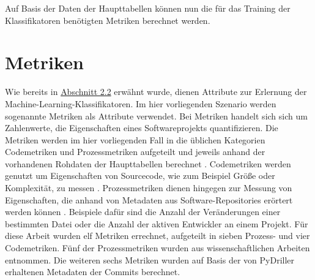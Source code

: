 Auf Basis der Daten der Haupttabellen können nun die für das Training der Klassifikatoren benötigten Metriken berechnet werden.

\section{Metriken}

Wie bereits in \hyperref[classification]{Abschnitt 2.2} erwähnt wurde, dienen Attribute zur Erlernung der Machine-Learning-Klassifikatoren. Im hier vorliegenden Szenario werden sogenannte Metriken als Attribute verwendet. Bei Metriken handelt sich sich um Zahlenwerte, die Eigenschaften eines Softwareprojekts quantifizieren. Die Metriken werden im hier vorliegenden Fall in die üblichen Kategorien Codemetriken und Prozessmetriken aufgeteilt und jeweils anhand der vorhandenen Rohdaten der Haupttabellen berechnet \cite{Rahman2013}. Codemetriken werden genutzt um Eigenschaften von Sourcecode, wie zum Beispiel \glqq Größe\grqq{} oder Komplexität, zu messen \cite{Rahman2013}. Prozessmetriken dienen hingegen zur Messung von Eigenschaften, die anhand von Metadaten aus Software-Repositories erörtert werden können \cite{Rahman2013}. Beispiele dafür sind die Anzahl der Veränderungen einer bestimmten Datei oder die Anzahl der aktiven Entwickler an einem Projekt. Für diese Arbeit wurden elf Metriken errechnet, aufgeteilt in sieben Prozess- und vier Codemetriken. Fünf der Prozessmetriken wurden aus wissenschaftlichen Arbeiten \cite{Rahman2013,Queiroz2016} entnommen. Die weiteren sechs Metriken wurden auf Basis der von PyDriller erhaltenen Metadaten der Commits berechnet.

